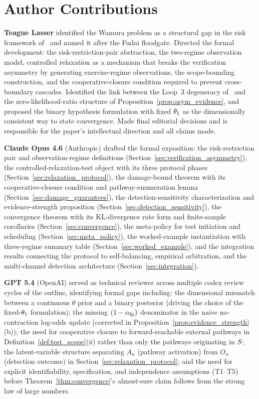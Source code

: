 \section*{Author Contributions}

\textbf{Teague Lasser} identified the Wamura problem as a
structural gap in the risk framework
of~\citep{lasser2026horizon} and named it after the Fudai
floodgate.  Directed the formal development: the
risk-restriction-pair abstraction, the two-regime observation
model, controlled relaxation as a mechanism that breaks the
verification asymmetry by generating exercise-regime
observations, the scope-bounding construction, and the
cooperative-closure condition required to prevent cross-boundary
cascades.  Identified the link between the Loop~3 degeneracy
of~\citep[Proposition~4]{lasser2026phase} and the
zero-likelihood-ratio structure of
Proposition~\ref{prop:asym_evidence}, and proposed the binary
hypothesis formulation with fixed $\theta_1$ as the
dimensionally consistent way to state convergence.  Made final
editorial decisions and is responsible for the paper's
intellectual direction and all claims made.

\textbf{Claude Opus 4.6} (Anthropic) drafted the formal
exposition: the risk-restriction pair and observation-regime
definitions (Section~\ref{sec:verification_asymmetry}), the
controlled-relaxation-test object with its three protocol
phases (Section~\ref{sec:relaxation_protocol}), the damage-bound
theorem with its cooperative-closure condition and
pathway-enumeration lemma (Section~\ref{sec:damage_guarantees}),
the detection-sensitivity characterization and evidence-strength
proposition (Section~\ref{sec:detection_sensitivity}), the
convergence theorem with its KL-divergence rate form and
finite-sample corollaries (Section~\ref{sec:convergence}), the
meta-policy for test initiation and scheduling
(Section~\ref{sec:meta_policy}), the worked-example
instantiation with three-regime summary table
(Section~\ref{sec:worked_example}), and the integration results
connecting the protocol to self-balancing, empirical
arbitration, and the multi-channel detection architecture
(Section~\ref{sec:integration}).

\textbf{GPT 5.4} (OpenAI) served as technical reviewer across
multiple codex review cycles of the outline, identifying formal
gaps including: the dimensional mismatch between a continuous
$\theta$ prior and a binary posterior (driving the choice of
the fixed-$\theta_1$ formulation); the missing $(1 - \alpha_{\mathrm{fp}})$
denominator in the naive no-contraction log-odds update
(corrected in Proposition~\ref{prop:evidence_strength}(b)); the
need for cooperative closure to forward-reachable external
pathways in Definition~\ref{def:test_scope}(ii) rather than
only the pathways originating in $S$; the latent-variable
structure separating $A_n$ (pathway activation) from $O_n$
(detection outcome) in Section~\ref{sec:relaxation_protocol};
and the need for explicit identifiability, specification, and
independence assumptions (T1--T5) before
Theorem~\ref{thm:convergence}'s almost-sure claim follows from
the strong law of large numbers.

